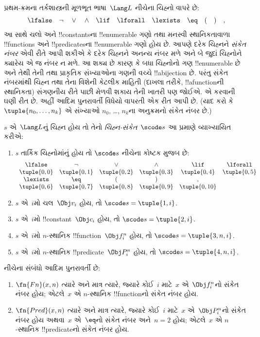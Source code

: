 \documentclass[../../../include/open-logic-section]{subfiles}
\begin{document}

પ્રથમ-ક્રમના તર્કશાસ્ત્રની મૂળભૂત ભાષા~$\Lang L$
નીચેના ચિહ્નો વાપરે છે:
\[
\lfalse \quad \lnot \quad \lor \quad \land \quad \lif \quad \lforall
\quad \lexists \quad \eq \quad ( \quad ) \quad ,
\]
આ સાથે ચલો અને !!{constant}sના
!!{enumerable} ગણો તથા મનસ્વી સ્થાનિકતાવાળા
!!{function}s અને !!{predicate}sના
!!{enumerable} ગણો હોય છે. આપણે દરેક
ચિહ્નને \emph{સંકેત નંબર} એવી રીતે આપી
શકીએ કે દરેક ચિહ્નને અનન્ય નંબર મળે અને
બે જુદાં ચિહ્નોને ક્યારેય એ જ નંબર ન મળે.
આ શક્ય છે કારણ કે બધા ચિહ્નોનો ગણ
!!{enumerable} છે અને તેથી તેની તથા
પ્રાકૃતિક સંખ્યાઓના ગણની વચ્ચે
!!a{bijection} છે. પરંતુ સંકેત નંબરમાંથી
ચિહ્ન તથા તેના વિશેની કેટલીક માહિતી
(દાખલા તરીકે, !!a{function}ની સ્થાનિકતા)
સંગણનીય રીતે પાછી મેળવી શકાય તેની
ખાતરી પણ જોઈએ. એ કરવાની ઘણી રીત છે.
અહીં આદિમ પુનરાવર્તી વિધેયો વાપરતી
એક રીત આપી છે. (યાદ કરો કે
$\tuple{n_0, \dots, n_k}$ એ સંખ્યાઓ
$n_0$, \dots, $n_k$ના અનુક્રમનો સંકેત
નંબર છે.)

\begin{defn}
$s$ એ~$\Lang L$નું ચિહ્ન હોય તો
તેનો \emph{ચિહ્ન-સંકેત}~$\scode s$
આ પ્રમાણે વ્યાખ્યાયિત કરીએ:
\begin{enumerate}
\item $s$ તાર્કિક ચિહ્નોમાંનું હોય તો
  $\scode s$ નીચેના કોષ્ટક મુજબ છે:
\[
\begin{array}{cccccccccc}
  \lfalse & \lnot & \lor & \land & \lif & \lforall \\
\tuple{0, 0} & \tuple{0, 1} & \tuple{0, 2} & \tuple{0, 3} &
\tuple{0, 4} & \tuple{0, 5} \\
\lexists & \eq & ( & ) & ,\\
\tuple{0, 6} & \tuple{0, 7} &
\tuple{0, 8} & \tuple{0, 9} & \tuple{0, 10}
\end{array}
\]
\item $s$ એ~$i$મો ચલ~$\Obj v_i$ હોય, તો $\scode s = \tuple{1, i}$.
\item $s$ એ~$i$મો !!{constant}~$\Obj c_i$ હોય, તો
  $\scode s = \tuple{2, i}$.
\item $s$ એ~$i$મો $n$-સ્થાનિક !!{function}~$\Obj f_i^n$ હોય, તો
  $\scode s = \tuple{3, n, i}$.
\item $s$ એ~$i$મો $n$-સ્થાનિક !!{predicate}~$\Obj P_i^n$ હોય, તો
  $\scode s = \tuple{4, n, i}$.
\end{enumerate}
\end{defn}

\begin{prop}
નીચેના સંબંધો આદિમ પુનરાવર્તી છે:
\begin{enumerate}
\item $\fn{Fn}(x, n)$ ત્યારે અને માત્ર ત્યારે,
  જ્યારે કોઈ~$i$ માટે~$x$ એ~$\Obj f^n_i$નો
  સંકેત નંબર હોય; એટલે~$x$ એ $n$-સ્થાનિક
  !!{function}નો સંકેત નંબર હોય.
\item $\fn{Pred}(x, n)$ ત્યારે અને માત્ર ત્યારે,
  જ્યારે કોઈ~$i$ માટે~$x$ એ~$\Obj P^n_i$નો
  સંકેત નંબર હોય અથવા~$x$ એ~$\eq$નો
  સંકેત નંબર અને~$n = 2$ હોય; એટલે~$x$
  એ $n$-સ્થાનિક !!{predicate}નો સંકેત
  નંબર હોય.
\end{enumerate}
\end{prop}
\end{document}
